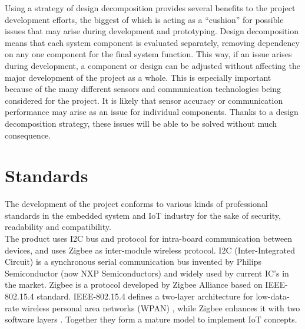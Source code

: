 \documentclass{report}
\begin{document}
Using a strategy of design decomposition provides several benefits to the project development efforts, the biggest of which is acting as a ``cushion'' for possible issues that may arise during development and prototyping. Design decomposition means that each system component is evaluated separately, removing dependency on any one component for the final system function. This way, if an issue arises during development, a component or design can be adjusted without affecting the major development of the project as a whole. This is especially important because of the many different sensors and communication technologies being considered for the project. It is likely that sensor accuracy or communication performance may arise as an issue for individual components. Thanks to a design decomposition strategy, these issues will be able to be solved without much consequence.
\newpage
\section{Standards}
The development of the project conforms to various kinds of professional standards in the embedded system and IoT industry for the sake of security, readability and compatibility. \\

The product uses I2C bus and protocol for intra-board communication between devices, and uses Zigbee as inter-module wireless protocol. I2C (Inter-Integrated Circuit) is a synchronous serial communication bus invented by Philips Semiconductor (now NXP Semiconductors) \cite{noauthor_um10204_2014} and widely used by current IC's in the market. Zigbee is a protocol developed by Zigbee Alliance based on IEEE-802.15.4 standard. IEEE-802.15.4 defines a two-layer architecture for low-data-rate wireless personal area networks (WPAN) \cite{noauthor_ieee_2016}, while Zigbee enhances it with two software layers \cite{zigbee_alliance_zigbee_nodate}. Together they form a mature model to implement IoT concepts. \\
\end{document}
